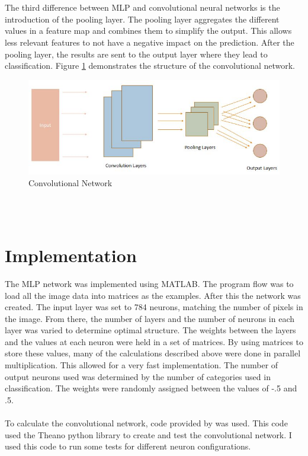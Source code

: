 \documentclass[12pt,twoside]{article} %
\begin{document}
\\\\
The third difference between MLP and convolutional neural networks is the introduction of the pooling layer. The pooling layer aggregates the different values in a feature map and combines them to simplify the output. This allows less relevant features to not have a negative impact on the prediction. After the pooling layer, the results are sent to the output layer where they lead to classification. Figure \ref{fig:conv} demonstrates the structure of the convolutional network.
\begin{figure}
	\hspace*{-.1cm}\includegraphics[scale=0.9]{conv}
	\caption{Convolutional Network}
	\label{fig:conv}
\end{figure} 
\\\\


\section{Implementation}
The MLP network was implemented using MATLAB. The program flow was to load all the image data into matrices as the examples. After this the network was created. The input layer was set to 784 neurons, matching the number of pixels in the image. From there, the number of layers and the number of neurons in each layer was varied to determine optimal structure. The weights between the layers and the values at each neuron were held in a set of matrices. By using matrices to store these values, many of the calculations described above were done in parallel multiplication. This allowed for a very fast implementation. The number of output neurons used was determined by the number of categories used in classification. The weights were randomly assigned between the values of -.5 and .5.
  \\\\
  To calculate the convolutional network, code provided by \cite{conv} was used. This code used the Theano python library to create and test the convolutional network. I used this code to run some tests for different neuron configurations.
\end{document}
